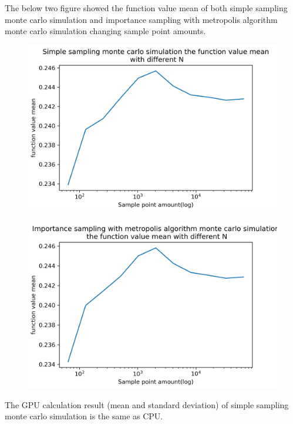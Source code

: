 \documentclass{article}
\begin{document}
	The below two figure showed the function value mean of both simple sampling monte carlo simulation and importance sampling with metropolis algorithm monte carlo simulation changing sample point amounts.
	\begin{figure}[hb!]
		\centering
		\includegraphics[width=0.9\linewidth]{notebook/ss_mean}
	\end{figure}
	\begin{figure}[hb!]
		\centering
		\includegraphics[width=0.9\linewidth]{notebook/mis_mean}
	\end{figure}

	The GPU calculation result (mean and standard deviation) of simple sampling monte carlo simulation is the same as CPU.
\end{document}
